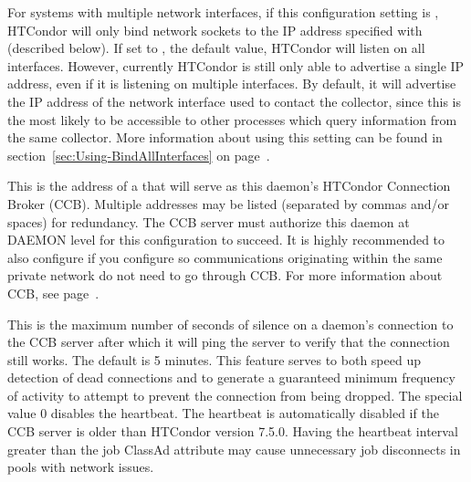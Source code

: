\begin{description}

\label{param:BindAllInterfaces}
\item[\Macro{BIND\_ALL\_INTERFACES}]
  For systems with multiple network interfaces, if this configuration
  setting is , HTCondor will only bind network sockets to 
  the IP address specified with
   (described below).  If set to ,
  the default value, HTCondor will listen on all interfaces.
  However, currently HTCondor is still only able to advertise a single
  IP address, even if it is listening on multiple interfaces.  By
  default, it will advertise the IP address of the network interface
  used to contact the collector, since this is the most likely to be
  accessible to other processes which query information from the same
  collector.
  More information about using this setting can be found in
  section~\ref{sec:Using-BindAllInterfaces} on
  page~\pageref{sec:Using-BindAllInterfaces}. 

\label{param:CcbAddress}
\item[\Macro{CCB\_ADDRESS}] This is the address of a
   that will serve as this daemon's HTCondor
  Connection Broker (CCB).  Multiple addresses may be listed
  (separated by commas and/or spaces) for redundancy.  The CCB server
  must authorize this daemon at DAEMON level for this configuration to
  succeed.  It is highly recommended to also configure
   if you configure 
  so communications originating within the same private network do not
  need to go through CCB.  For more information about CCB,
  see page~\pageref{sec:CCB}.

\label{param:CcbHeartbeatInterval}
\item[\Macro{CCB\_HEARTBEAT\_INTERVAL}] This is the maximum
  number of seconds of silence on a daemon's connection to the CCB server
  after which it will ping the server to verify that the connection still
  works.  The default is 5 minutes.  This feature serves to both speed
  up detection of dead connections and to generate a guaranteed minimum
  frequency of activity to attempt to prevent the connection from being
  dropped.  The special value 0 disables the heartbeat.  The heartbeat
  is automatically disabled if the CCB server is older than 
  HTCondor version 7.5.0.  
  Having the heartbeat interval greater than the job ClassAd attribute
   may cause
  unnecessary job disconnects in pools with network issues.


\end{description}
